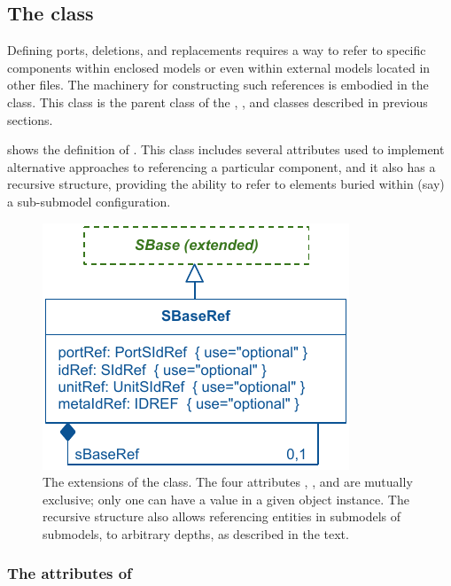\subsection{The  class}
\label{sbaseref-class}

Defining ports, deletions, and replacements requires a way to refer to specific components within enclosed models or even within external models located in other files.  The machinery for constructing such references is embodied in the \SBaseRef class.  This class is the parent class of the \Port, \Deletion, \ReplacedElement and \ReplacedBy classes described in previous sections.

 shows the definition of \SBaseRef.  This class includes several attributes used to implement alternative approaches to referencing a particular component, and it also has a recursive structure, providing the ability to refer to elements buried within (say) a sub-submodel configuration.

\begin{figure}[hbt]
  \includegraphics{figs/sbaseref-uml}
  \caption{The extensions of the \SBaseRef class.  The four attributes
    , ,  and 
    are mutually exclusive; only one can have a value in a given object
    instance.  The recursive structure also allows referencing entities
    in submodels of submodels, to arbitrary depths, as described in the
    text.}
  \label{sbaseref-uml}
\end{figure}


\subsubsection{The attributes of }

